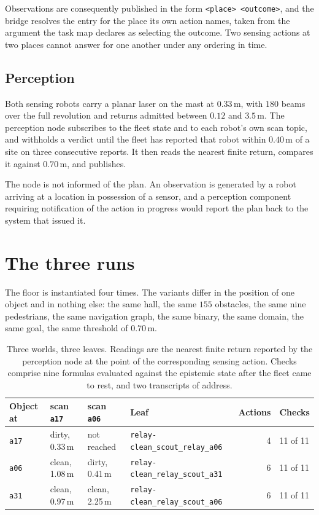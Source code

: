 \documentclass[11pt,a4paper]{article}
\theoremstyle{definition}
\newcommand{\code}[1]{\texttt{\small #1}}
\newcommand{\site}[1]{\code{#1}}
\begin{document}
Observations are consequently published in the form
\code{<place> <outcome>}, and the bridge resolves the entry for the place its
own action names, taken from the argument the task map declares as selecting
the outcome. Two sensing actions at two places cannot answer for one another
under any ordering in time.

\subsection{Perception}

Both sensing robots carry a planar laser on the mast at $0.33$\,m, with $180$
beams over the full revolution and returns admitted between $0.12$ and
$3.5$\,m. The perception node subscribes to the fleet state and to each robot's
own scan topic, and withholds a verdict until the fleet has reported that robot
within $0.40$\,m of a site on three consecutive reports. It then reads the
nearest finite return, compares it against $0.70$\,m, and publishes.

The node is not informed of the plan. An observation is generated by a robot
arriving at a location in possession of a sensor, and a perception component
requiring notification of the action in progress would report the plan back to
the system that issued it.

\section{The three runs}
\label{sec:runs}

The floor is instantiated four times. The variants differ in the position of
one object and in nothing else: the same hall, the same $155$ obstacles, the
same nine pedestrians, the same navigation graph, the same binary, the same
domain, the same goal, the same threshold of $0.70$\,m.

\begin{table}[H]
\centering\small
\caption{Three worlds, three leaves. Readings are the nearest finite return
reported by the perception node at the point of the corresponding sensing
action. Checks comprise nine formulas evaluated against the epistemic state
after the fleet came to rest, and two transcripts of address.}
\label{tab:runs}
\begin{tabular}{@{}llllrl@{}}
\toprule
\textbf{Object at} & \textbf{scan \site{a17}} & \textbf{scan \site{a06}}
  & \textbf{Leaf} & \textbf{Actions} & \textbf{Checks} \\
\midrule
\site{a17} & dirty, 0.33\,m & not reached &
  \code{relay-clean\_scout\_relay\_a06} & 4 & 11 of 11 \\
\site{a06} & clean, 1.08\,m & dirty, 0.41\,m &
  \code{relay-clean\_relay\_scout\_a31} & 6 & 11 of 11 \\
\site{a31} & clean, 0.97\,m & clean, 2.25\,m &
  \code{relay-clean\_relay\_scout\_a06} & 6 & 11 of 11 \\
\bottomrule
\end{tabular}
\end{table}
\end{document}
